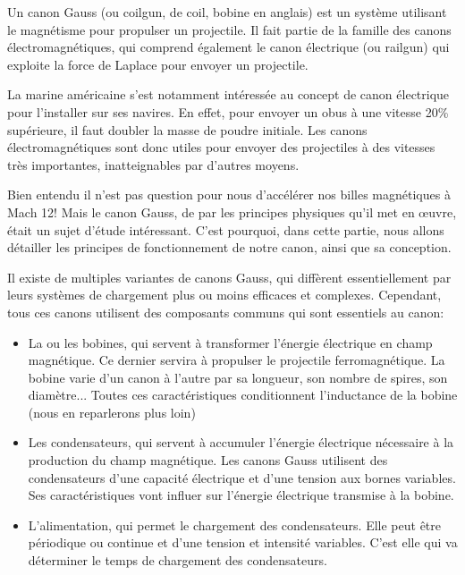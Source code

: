 Un canon Gauss (ou coilgun, de coil, bobine en anglais) est un
système utilisant le magnétisme pour propulser un projectile.
Il fait partie de la famille des canons électromagnétiques, qui
comprend également le canon électrique (ou railgun) qui exploite
la force de Laplace pour envoyer un projectile.

La marine américaine s'est notamment intéressée au concept de
canon électrique pour l'installer sur ses navires. En effet,
pour envoyer un obus à une vitesse 20\% supérieure, il faut
doubler la masse de poudre initiale. Les canons
électromagnétiques sont donc utiles pour envoyer des
projectiles à des vitesses très importantes, inatteignables par
d'autres moyens.

Bien entendu il n'est pas question pour nous d'accélérer nos
billes magnétiques à Mach 12! Mais le canon Gauss, de par les
principes physiques qu'il met en œuvre, était un sujet d'étude
intéressant. C'est pourquoi, dans cette partie, nous allons
détailler les principes de fonctionnement de notre canon,
ainsi que sa conception.

Il existe de multiples variantes de canons Gauss, qui diffèrent
essentiellement par leurs systèmes de chargement plus ou moins 
efficaces et complexes. Cependant, tous ces canons utilisent
des composants communs qui sont essentiels au canon:
\begin{itemize}
\item La ou les bobines, qui servent à transformer l'énergie
électrique en champ magnétique. Ce dernier servira à propulser
le projectile ferromagnétique. La bobine varie d'un canon à
l'autre par sa longueur, son nombre de spires, son diamètre...
Toutes ces caractéristiques conditionnent l'inductance de la
bobine (nous en reparlerons plus loin)

\item Les condensateurs, qui servent à accumuler l'énergie électrique
nécessaire à la production du champ magnétique. Les canons
Gauss utilisent des condensateurs d'une capacité électrique et
d'une tension aux bornes variables. Ses caractéristiques vont
influer sur l'énergie électrique transmise à la bobine.

\item L'alimentation, qui permet le chargement des condensateurs. Elle
peut être périodique ou continue et d'une tension et intensité
variables. C'est elle qui va déterminer le temps de chargement
des condensateurs.
\end{itemize}

